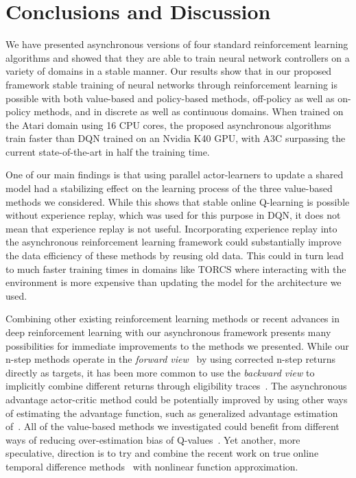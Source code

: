 %
\vspace{-0.1cm}
\section{Conclusions and Discussion}

We have presented asynchronous versions of four standard reinforcement learning algorithms and showed that they are able to train neural network controllers on a variety of domains in a stable manner.
Our results show that in our proposed framework stable training of neural networks through reinforcement learning is possible with both value-based and policy-based methods, off-policy as well as on-policy methods, and in discrete as well as continuous domains.
When trained on the Atari domain using 16 CPU cores, the proposed asynchronous algorithms train faster than DQN trained on an Nvidia K40 GPU, with A3C surpassing the current state-of-the-art in half the training time.
%

One of our main findings is that using parallel actor-learners to update a shared model had a stabilizing effect on the learning process of the three value-based methods we considered.
While this shows that stable online Q-learning is possible without experience replay, which was used for this purpose in DQN, it does not mean that experience replay is not useful.
Incorporating experience replay into the asynchronous reinforcement learning framework could substantially improve the data efficiency of these methods by reusing old data.
This could in turn lead to much faster training times in domains like TORCS where interacting with the environment is more expensive than updating the model for the architecture we used.

Combining other existing reinforcement learning methods or recent advances in deep reinforcement learning with our asynchronous framework presents many possibilities for immediate improvements to the methods we presented.
While our n-step methods operate in the \emph{forward view}~\citep{sutton:book} by using corrected n-step returns directly as targets, it has been more common to use the \emph{backward view} to implicitly combine different returns through eligibility traces~\citep{watkins1989learning,sutton:book,peng1996msq}.
The asynchronous advantage actor-critic method could be potentially improved by using other ways of estimating the advantage function, such as generalized advantage estimation of~\cite{schulman2015gae}.
%
All of the value-based methods we investigated could benefit from different ways of reducing over-estimation bias of Q-values~\citep{hado2015doubledqn,bellemare2016gap}.
Yet another, more speculative, direction is to try and combine the recent work on true online temporal difference methods~\citep{seijen2015true} with nonlinear function approximation.

